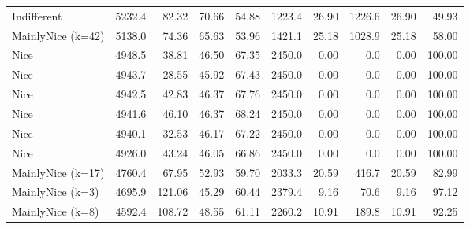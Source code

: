 \documentclass[journal,10pt,twoside]{IEEEtran}
\begin{document}
\begin{table}[ht]
\begin{tabular}{l|rrrr|rrrrr}
        Indifferent       & 5232.4 &  82.32 &  70.66 &   54.88 & 1223.4 &                  26.90 & 1226.6 &                   26.90 &    49.93 \\
        MainlyNice (k=42) & 5138.0 &  74.36 &  65.63 &   53.96 & 1421.1 &                  25.18 & 1028.9 &                   25.18 &    58.00 \\
        Nice              & 4948.5 &  38.81 &  46.50 &   67.35 & 2450.0 &                   0.00 &    0.0 &                    0.00 &   100.00 \\
        Nice              & 4943.7 &  28.55 &  45.92 &   67.43 & 2450.0 &                   0.00 &    0.0 &                    0.00 &   100.00 \\
        Nice              & 4942.5 &  42.83 &  46.37 &   67.76 & 2450.0 &                   0.00 &    0.0 &                    0.00 &   100.00 \\
        Nice              & 4941.6 &  46.10 &  46.37 &   68.24 & 2450.0 &                   0.00 &    0.0 &                    0.00 &   100.00 \\
        Nice              & 4940.1 &  32.53 &  46.17 &   67.22 & 2450.0 &                   0.00 &    0.0 &                    0.00 &   100.00 \\
        Nice              & 4926.0 &  43.24 &  46.05 &   66.86 & 2450.0 &                   0.00 &    0.0 &                    0.00 &   100.00 \\
        MainlyNice (k=17) & 4760.4 &  67.95 &  52.93 &   59.70 & 2033.3 &                  20.59 &  416.7 &                   20.59 &    82.99 \\
        MainlyNice (k=3)  & 4695.9 & 121.06 &  45.29 &   60.44 & 2379.4 &                   9.16 &   70.6 &                    9.16 &    97.12 \\
        MainlyNice (k=8)  & 4592.4 & 108.72 &  48.55 &   61.11 & 2260.2 &                  10.91 &  189.8 &                   10.91 &    92.25 \\ \bottomrule
    \end{tabular}
\end{table}
\end{document}
